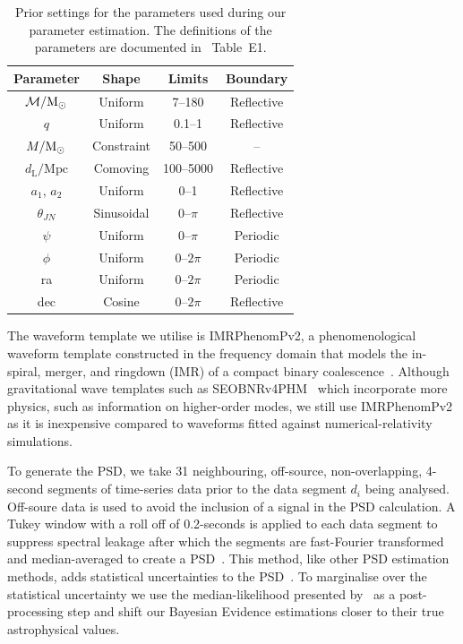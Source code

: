 \documentclass[%
 nofootinbib,
 amsmath,amssymb,
 aps,
 twocolumn
]{revtex4-2}
\newcommand{\imrphenomp}{{\sc IMRPhenomPv2}\xspace}
\newcommand{\seob}{{\sc SEOBNRv4PHM}\xspace}
\newcommand{\mathcmd}[1]{{\sc \relax\ifmmode#1\else $#1$\fi}\xspace}
\newcommand{\msun}{\mathcmd{\text{M}_\odot}}
\begin{document}
\begin{table}
    \centering
    \caption{
    Prior settings for the parameters used during our parameter estimation. The definitions of the parameters are documented in \citet{bilby_gwtc}~Table~E1.\label{tab:priors}}
    \begin{tabular}{c c c c}
    \hline
    Parameter & Shape & Limits & Boundary \\
    \hline
          $\mathcal{M}/\msun$           & Uniform & 7--180 & Reflective \\
          $q$                           & Uniform & 0.1--1 & Reflective \\
          $M/\msun$                     & Constraint & 50--500 & -- \\
          $d_\mathrm{L}/\mathrm{Mpc}$   & Comoving & 100--5000 & Reflective \\
          $a_1$, $a_2$                  & Uniform & 0--1 & Reflective \\
          $\theta_{JN}$                 & Sinusoidal & 0--$\pi$ &  Reflective \\
          $\psi$                        & Uniform & 0--$\pi$ &  Periodic \\
          $\phi$                        & Uniform & 0--$2\pi$ &  Periodic \\
          ra                            & Uniform & 0--$2\pi$ &  Periodic \\
          dec                           & Cosine & 0--$2\pi$ &  Reflective \\
    \hline
    \end{tabular}
\end{table}


The waveform template we utilise is \imrphenomp, a phenomenological waveform template constructed in the frequency domain that models the in-spiral, merger, and ringdown (IMR) of a compact binary coalescence~\citep{khan2016frequency}. Although gravitational wave templates such as \seob~\cite{seobnrv4phm} which incorporate more physics, such as information on higher-order modes, we still use \imrphenomp as it is inexpensive compared to waveforms fitted
against numerical-relativity simulations.

To generate the PSD, we take 31 neighbouring, off-source, non-overlapping,  4-second  segments of time-series data prior to the data segment $d_i$ being analysed. Off-soure data is used to avoid the inclusion of a signal in the PSD calculation. A Tukey window with a roll off of 0.2-seconds is applied to each data segment to suppress spectral leakage after which the segments are fast-Fourier transformed and median-averaged to create a PSD~\cite{ligo_psd}. This method, like other PSD estimation methods, adds statistical uncertainties to the PSD~\cite{psd_student_t, chatziioannou2019noise}. To marginalise over the statistical uncertainty we use the median-likelihood presented by~\citet{psd_student_t} as a post-processing step and shift our Bayesian Evidence estimations closer to their true astrophysical values. 
\end{document}
